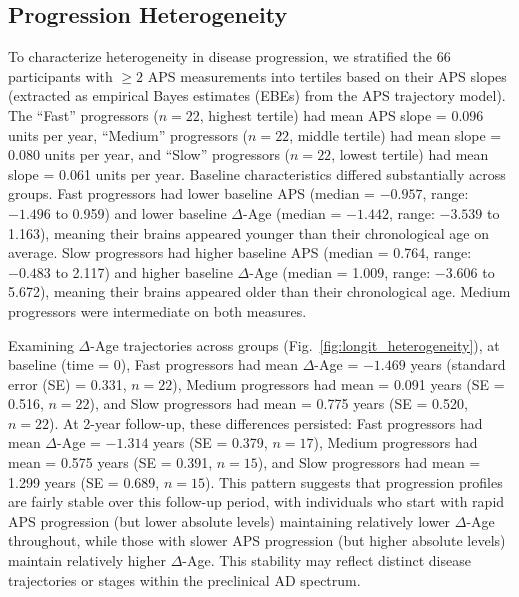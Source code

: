 \documentclass[conference]{IEEEtran}
\begin{document}
\subsection{Progression Heterogeneity}

To characterize heterogeneity in disease progression, we stratified the 66 participants with $\geq 2$ APS measurements into tertiles based on their APS slopes (extracted as empirical Bayes estimates (EBEs) from the APS trajectory model). The ``Fast'' progressors ($n=22$, highest tertile) had mean APS slope = 0.096 units per year, ``Medium'' progressors ($n=22$, middle tertile) had mean slope = 0.080 units per year, and ``Slow'' progressors ($n=22$, lowest tertile) had mean slope = 0.061 units per year. Baseline characteristics differed substantially across groups. Fast progressors had lower baseline APS (median = $-0.957$, range: $-1.496$ to 0.959) and lower baseline $\Delta$-Age (median = $-1.442$, range: $-3.539$ to 1.163), meaning their brains appeared younger than their chronological age on average. Slow progressors had higher baseline APS (median = 0.764, range: $-0.483$ to 2.117) and higher baseline $\Delta$-Age (median = 1.009, range: $-3.606$ to 5.672), meaning their brains appeared older than their chronological age. Medium progressors were intermediate on both measures.

Examining $\Delta$-Age trajectories across groups (Fig.~\ref{fig:longit_heterogeneity}), at baseline (time = 0), Fast progressors had mean $\Delta$-Age = $-1.469$ years (standard error (SE) = 0.331, $n=22$), Medium progressors had mean = 0.091 years (SE = 0.516, $n=22$), and Slow progressors had mean = 0.775 years (SE = 0.520, $n=22$). At 2-year follow-up, these differences persisted: Fast progressors had mean $\Delta$-Age = $-1.314$ years (SE = 0.379, $n=17$), Medium progressors had mean = 0.575 years (SE = 0.391, $n=15$), and Slow progressors had mean = 1.299 years (SE = 0.689, $n=15$). This pattern suggests that progression profiles are fairly stable over this follow-up period, with individuals who start with rapid APS progression (but lower absolute levels) maintaining relatively lower $\Delta$-Age throughout, while those with slower APS progression (but higher absolute levels) maintain relatively higher $\Delta$-Age. This stability may reflect distinct disease trajectories or stages within the preclinical AD spectrum.
\end{document}
